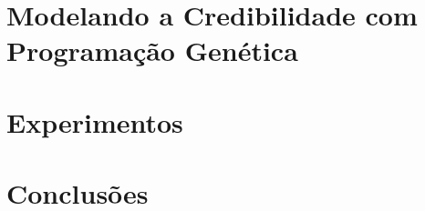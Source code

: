 \documentclass[msc]{ppgccufmg}
\begin{document}
\chapter{Modelando a Credibilidade com Programação Genética}
\label{cap::04_pg_cred}


\chapter{Experimentos}
\label{cap::05_experimentos}
%

\chapter{Conclusões}
\label{cap::06_conclusoes}
%

\end{document}
